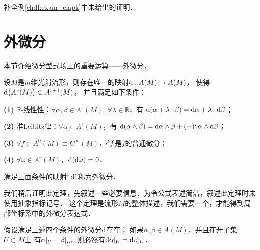 \begin{exercise}
	补全例\ref{chdf:exam_eiapk}中未给出的证明．
\end{exercise}



\section{外微分}\label{chdf:sec_exterior-diff}
本节介绍微分型式场上的重要运算——外微分．
\begin{theorem}\label{chdf:thm_exterior-differential}
    设$M$是$m$维光滑流形，则存在唯一的映射${\rm d}: A(M)\to A(M)$，
    使得${\rm d}\bigl(A^r(M)\bigr)\subset A^{r+1}(M)$，
    并且满足如下条件：

    {\bfseries (1)} $\mathbb{R}$-线性性：$\forall \alpha, \beta \in A^r(M), \ \forall \lambda \in \mathbb{R}$，有
      ${\rm d}(\alpha+ \lambda \cdot \beta) = {\rm d} \alpha+ \lambda \cdot {\rm d} \beta$；

    {\bfseries (2)} 准Leibitz律：$\forall \alpha \in A^{r}(M)$，有
      ${\rm d}(\alpha \wedge \beta) = {\rm d} \alpha \wedge \beta + (-)^{r} \alpha \wedge {\rm d} \beta$；

    {\bfseries (3)} $\forall f \in A^0(M) \equiv C^\infty(M)$，${\rm d} f$是$f$的普通微分；

    {\bfseries (4)} $\forall \omega \in A^r(M)$，${\rm d}({\rm d} \omega)=0$．

    满足上面条件的映射“${\rm d}$”称为{\heiti 外微分}．
\end{theorem}
我们稍后证明此定理，先叙述一些必要信息．为令公式表述简洁，叙述此定理时未使用抽象指标记号．
这个定理是流形$M$的整体描述，我们需要一个，才能得到局部坐标系中的外微分表达式．
\begin{lemma}\label{chdm:thm_d-exiterior-local}
    假设满足上述四个条件的外微分${\rm d}$存在；
    如果$\alpha, \beta \in A(M)$，并且在开子集$U\subset M$上
    有$\alpha|_U = \beta|_U$，则必然有${\rm d}\alpha|_U = {\rm d}\beta|_U$．
\end{lemma}
